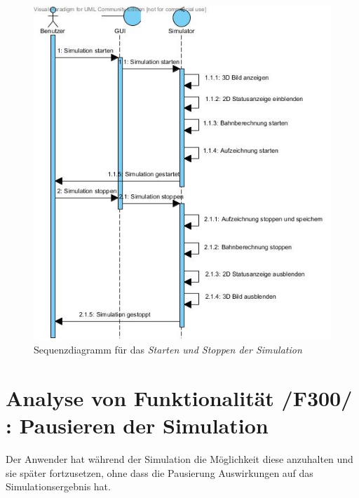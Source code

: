 \begin{figure}[h!]
\includegraphics[width=\linewidth]{bilder/Simulator_Starten_Stoppen}
\caption{Sequenzdiagramm für das \textit{Starten und Stoppen der Simulation}}
\end{figure}

\section{Analyse von Funktionalität /F300/ :  Pausieren der Simulation}
Der Anwender hat während der Simulation die Möglichkeit diese anzuhalten und sie später fortzusetzen, ohne dass die Pausierung Auswirkungen auf das Simulationsergebnis hat.
\newline

